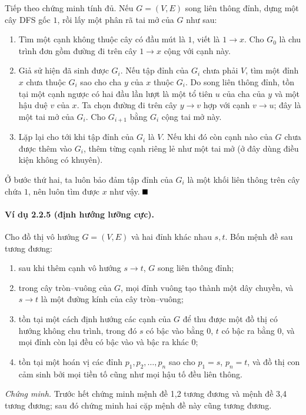 \documentclass[11pt]{article}
\renewcommand{\leadsto}{\mathrel{\longrightarrow}}
\providecommand{\square}{\mathord{\vcenter{\hrule height .6em width .6em}}}
\begin{document}
Tiếp theo chứng minh tính đủ. Nếu $G=(V,E)$ song liên thông đỉnh, dựng một cây
DFS gốc $1$, rồi lấy một phân rã tai mở của $G$ như sau:
\begin{enumerate}
  \item Tìm một cạnh không thuộc cây có đầu mút là $1$, viết là $1\to x$. Cho
  $G_0$ là chu trình đơn gồm đường đi trên cây $1\leadsto x$ cộng với cạnh này.
  \item Giả sử hiện đã sinh được $G_i$. Nếu tập đỉnh của $G_i$ chưa phải $V$,
  tìm một đỉnh $x$ chưa thuộc $G_i$ sao cho cha $y$ của $x$ thuộc $G_i$. Do song
  liên thông đỉnh, tồn tại một cạnh ngược có hai đầu lần lượt là một tổ tiên $u$
  của cha của $y$ và một hậu duệ $v$ của $x$. Ta chọn đường đi trên cây
  $y\leadsto v$ hợp với cạnh $v\to u$; đây là một tai mở của $G_i$. Cho
  $G_{i+1}$ bằng $G_i$ cộng tai mở này.
  \item Lặp lại cho tới khi tập đỉnh của $G_i$ là $V$. Nếu khi đó còn cạnh nào
  của $G$ chưa được thêm vào $G_i$, thêm từng cạnh riêng lẻ như một tai mở (ở
  đây dùng điều kiện không có khuyên).
\end{enumerate}
Ở bước thứ hai, ta luôn bảo đảm tập đỉnh của $G_i$ là một khối liên thông trên
cây chứa $1$, nên luôn tìm được $x$ như vậy. \hfill$\square$

\paragraph{Ví dụ 2.2.5 (định hướng lưỡng cực).}
Cho đồ thị vô hướng $G=(V,E)$ và hai đỉnh khác nhau $s,t$. Bốn mệnh đề sau tương
đương:
\begin{enumerate}
  \item sau khi thêm cạnh vô hướng $s\to t$, $G$ song liên thông đỉnh;
  \item trong cây tròn--vuông của $G$, mọi đỉnh vuông tạo thành một dây chuyền,
  và $s\leadsto t$ là một đường kính của cây tròn--vuông;
  \item tồn tại một cách định hướng các cạnh của $G$ để thu được một đồ thị có
  hướng không chu trình, trong đó $s$ có bậc vào bằng $0$, $t$ có bậc ra bằng
  $0$, và mọi đỉnh còn lại đều có bậc vào và bậc ra khác $0$;
  \item tồn tại một hoán vị các đỉnh $p_1,p_2,\ldots,p_n$ sao cho
  $p_1=s$, $p_n=t$, và đồ thị con cảm sinh bởi mọi tiền tố cũng như mọi hậu tố
  đều liên thông.
\end{enumerate}

\emph{Chứng minh.}
Trước hết chứng minh mệnh đề 1,2 tương đương và mệnh đề 3,4 tương đương; sau đó
chứng minh hai cặp mệnh đề này cũng tương đương.
\end{document}
